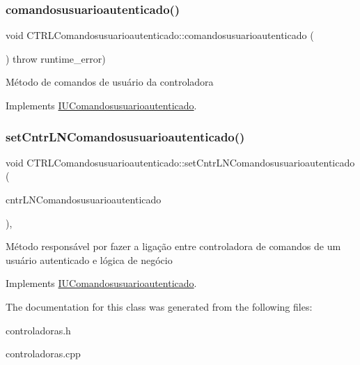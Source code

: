 \subsubsection{\texorpdfstring{comandosusuarioautenticado()}{comandosusuarioautenticado()}}
{\footnotesize\ttfamily void C\+T\+R\+L\+Comandosusuarioautenticado\+::comandosusuarioautenticado (\begin{DoxyParamCaption}{ }\end{DoxyParamCaption}) throw  runtime\+\_\+error) \hspace{0.3cm}{\ttfamily [virtual]}}

Método de comandos de usuário da controladora 

Implements \hyperlink{classIUComandosusuarioautenticado}{I\+U\+Comandosusuarioautenticado}.

\mbox{\label{classCTRLComandosusuarioautenticado_a921e8dec09b5861ea96b737b673ab785}} 
\subsubsection{\texorpdfstring{set\+Cntr\+L\+N\+Comandosusuarioautenticado()}{setCntrLNComandosusuarioautenticado()}}
{\footnotesize\ttfamily void C\+T\+R\+L\+Comandosusuarioautenticado\+::set\+Cntr\+L\+N\+Comandosusuarioautenticado (\begin{DoxyParamCaption}\item[{\hyperlink{classILNComandosusuarioautenticado}{I\+L\+N\+Comandosusuarioautenticado} $\ast$}]{cntr\+L\+N\+Comandosusuarioautenticado }\end{DoxyParamCaption})\hspace{0.3cm}{\ttfamily [inline]}, {\ttfamily [virtual]}}

Método responsável por fazer a ligação entre controladora de comandos de um usuário autenticado e lógica de negócio 

Implements \hyperlink{classIUComandosusuarioautenticado}{I\+U\+Comandosusuarioautenticado}.



The documentation for this class was generated from the following files\+:\begin{DoxyCompactItemize}
\item 
controladoras.\+h\item 
controladoras.\+cpp\end{DoxyCompactItemize}
